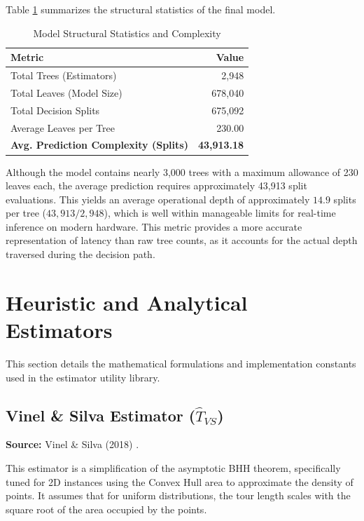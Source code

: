 \documentclass{article}
\begin{document}
Table \ref{tab:complexity} summarizes the structural statistics of the final model.

\begin{table}[h]
    \centering
    \caption{Model Structural Statistics and Complexity}
    \label{tab:complexity}
    \begin{tabular}{@{}lr@{}}
        \toprule
        \textbf{Metric} & \textbf{Value} \\ \midrule
        Total Trees (Estimators) & 2,948 \\
        Total Leaves (Model Size) & 678,040 \\
        Total Decision Splits & 675,092 \\
        Average Leaves per Tree & 230.00 \\ \midrule
        \textbf{Avg. Prediction Complexity (Splits)} & \textbf{43,913.18} \\
        \bottomrule
    \end{tabular}
\end{table}

Although the model contains nearly 3,000 trees with a maximum allowance of 230 leaves each, the average prediction requires approximately 43,913 split evaluations. This yields an average operational depth of approximately $14.9$ splits per tree ($43,913 / 2,948$), which is well within manageable limits for real-time inference on modern hardware. This metric provides a more accurate representation of latency than raw tree counts, as it accounts for the actual depth traversed during the decision path.


\section{Heuristic and Analytical Estimators}

This section details the mathematical formulations and implementation constants used in the estimator utility library.

\subsection{Vinel \& Silva Estimator ($\hat{T}_{VS}$)}
\textbf{Source:} Vinel \& Silva (2018) \cite{vinel2018}.

This estimator is a simplification of the asymptotic BHH theorem, specifically tuned for 2D instances using the Convex Hull area to approximate the density of points. It assumes that for uniform distributions, the tour length scales with the square root of the area occupied by the points.
\end{document}
